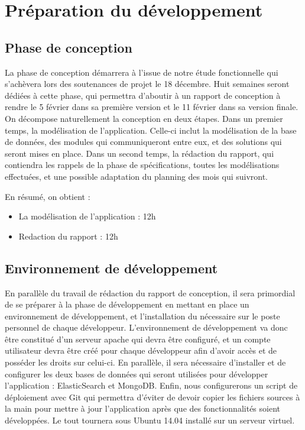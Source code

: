 \section{Préparation du développement}
\label{sec:prep_dev}
    \subsection{Phase de conception}
    \label{subsec:conception}
        La phase de conception démarrera à l'issue de notre étude fonctionnelle qui s'achèvera lors des soutenances de projet le 18 décembre. Huit semaines seront dédiées à cette phase, qui permettra d'aboutir à un rapport de conception à rendre le 5 février dans sa première version et le 11 février dans sa version finale. On décompose naturellement la conception en deux étapes. Dans un premier temps, la modélisation de l'application. Celle-ci inclut la modélisation de la base de données, des modules qui communiqueront entre eux, et des solutions qui seront mises en place. Dans un second temps, la rédaction du rapport, qui contiendra les rappels de la phase de spécifications, toutes les modélisations effectuées, et une possible adaptation du planning des mois qui suivront.

        En résumé, on obtient :
        \begin{itemize}
            \item La modélisation de l'application : 12h
            \item Redaction du rapport : 12h
        \end{itemize}

    \subsection{Environnement de développement}
    \label{subsec:env_dev}
        En parallèle du travail de rédaction du rapport de conception, il sera primordial de se préparer à la phase de développement en mettant en place un environnement de développement, et l'installation du nécessaire sur le poste personnel de chaque développeur. L'environnement de développement va donc être constitué d'un serveur apache qui devra être configuré, et un compte utilisateur devra être créé pour chaque développeur afin d'avoir accès et de posséder les droits sur celui-ci. En parallèle, il sera nécessaire d'installer et de configurer les deux bases de données qui seront utilisées pour développer l'application : ElasticSearch et MongoDB. Enfin, nous configurerons un script de déploiement avec Git qui permettra d'éviter de devoir copier les fichiers sources à la main pour mettre à jour l'application après que des fonctionnalités soient développées. Le tout tournera sous Ubuntu 14.04 installé sur un serveur virtuel.

